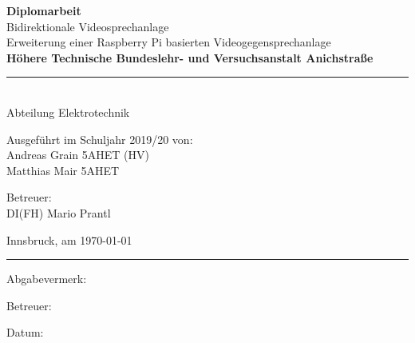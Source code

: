 \begin{center}
	\vspace*{2cm}
	\Huge\textbf{Diplomarbeit}\\
	\vspace*{2cm}
	\huge Bidirektionale Videosprechanlage\\
	\vspace*{0.5cm}
	\normalsize Erweiterung einer Raspberry Pi basierten Videogegensprechanlage\\
	\vspace*{1.5cm}
	\textbf{Höhere Technische Bundeslehr- und Versuchsanstalt Anichstraße}\\
	\vspace*{0.5cm}
	\rule{0.75\linewidth}{0.4pt}\\
	\vspace*{0.5cm}
	Abteilung Elektrotechnik\\
	\vspace*{1cm}
	\begin{minipage}[t]{0.425\linewidth}
		\begin{flushleft}
			Ausgeführt im Schuljahr 2019/20 von:\bigskip\\
			Andreas Grain 5AHET (HV)\\
			Matthias Mair 5AHET\\
		\end{flushleft}
	\end{minipage}
	\begin{minipage}[t]{0.425\linewidth}
		\begin{flushright}
			Betreuer:\bigskip\\
			DI(FH) Mario Prantl\\
		\end{flushright}
	\end{minipage}
\end{center}
\vspace*{1cm}
\vfill
Innsbruck, am \today
\vspace*{1cm}
\hrule
\vspace*{1cm}
\noindent\begin{minipage}{0.495\linewidth}
	Abgabevermerk:	
\end{minipage}
\begin{minipage}{0.495\linewidth}
	Betreuer:	
\end{minipage}
\begin{flushleft}
	Datum:
\end{flushleft}
\restoregeometry